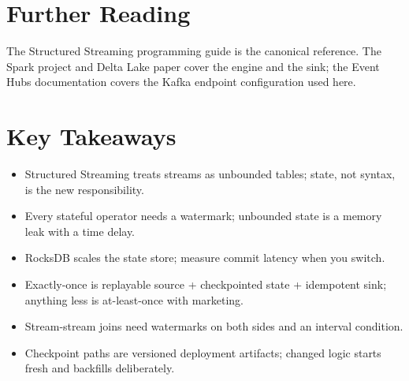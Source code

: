 \section{Further Reading}
The Structured Streaming programming guide \cite{apache2025structuredStreaming} is the canonical reference. The Spark project \cite{apache2025spark} and Delta Lake paper \cite{armbrust2020delta} cover the engine and the sink; the Event Hubs documentation \cite{microsoft2025eventhubs} covers the Kafka endpoint configuration used here.

\section*{Key Takeaways}
\begin{itemize}
    \item Structured Streaming treats streams as unbounded tables; state, not syntax, is the new responsibility.
    \item Every stateful operator needs a watermark; unbounded state is a memory leak with a time delay.
    \item RocksDB scales the state store; measure commit latency when you switch.
    \item Exactly-once is replayable source + checkpointed state + idempotent sink; anything less is at-least-once with marketing.
    \item Stream-stream joins need watermarks on both sides and an interval condition.
    \item Checkpoint paths are versioned deployment artifacts; changed logic starts fresh and backfills deliberately.
\end{itemize}

